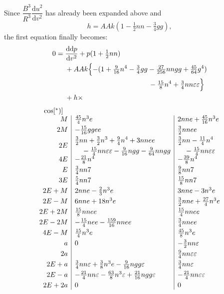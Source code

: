 \begingroup
{}
\renewcommand{\headrulewidth}{0pt}
\par\noindent Since \(\dfrac{B^3}{R^3}\dfrac{\mathrm du^2}{\mathrm dv^2}\) has already been expanded above and
\[
h=AAk(1-\tfrac12nn-\tfrac34gg),
\]
\noindent the first equation finally becomes:
\[
\begin{aligned}
0={}&\frac{\mathrm d\mathrm dp}{\mathrm dv^2}+p(1+\tfrac12nn)\\
&+AAk\Bigl\{-(1+\tfrac{9}{16}n^4-\tfrac34gg-\tfrac{27}{256}nngg+\tfrac{45}{64}g^4)\\
&\hspace{42mm}-\tfrac{15}{8}n^4+\tfrac34nn\varepsilon\varepsilon\Bigr\}\\
&+h\times
\end{aligned}
\]
\[
\begin{array}{r|l|l}
\multicolumn{1}{c}{\cos[{}^{*})]}&\multicolumn{1}{c}{}&\\
M&\tfrac{45}{4}n^3e&2nne+\tfrac{45}{16}n^3e\\[3pt]
2M&-\tfrac{15}{16}ggee&\tfrac32nnee\\[3pt]
2E&\begin{aligned}
&\tfrac32nn+\tfrac32n^3+\tfrac94n^4+3nnee\\
&\quad-\tfrac{15}{4}nn\varepsilon\varepsilon-\tfrac{9}{16}ngg-\tfrac{9}{64}nngg
\end{aligned}&
\begin{aligned}
&\tfrac32nn-\tfrac{11}{4}n^4\\
&\quad-\tfrac{15}{4}nn\varepsilon\varepsilon
\end{aligned}\\[3pt]
4E&-\tfrac{21}{8}n^4&-\tfrac{39}{8}n^4\\[3pt]
E&\tfrac34nn7&\tfrac98nn7\\[3pt]
3E&\tfrac54nn7&\tfrac{15}{8}nn7\\[3pt]
2E+M&2nne-\tfrac23n^3e&3nne-3n^3e\\[3pt]
2E-M&6nne+18n^3e&\tfrac32nne+\tfrac{27}{4}n^3e\\[3pt]
2E+2M&\tfrac{15}{8}nnee&\tfrac{15}{4}nnee\\[3pt]
2E-2M&-\tfrac{15}{4}nee-\tfrac{159}{16}nnee&\tfrac34nnee\\[3pt]
4E-M&\tfrac{15}{4}n^3e&\tfrac{45}{8}n^3e\\[3pt]
a&0&-\tfrac32nn\varepsilon\\[3pt]
2a&&\tfrac94nn\varepsilon\varepsilon\\[3pt]
2E+a&\tfrac34nn\varepsilon+\tfrac38n^3e-\tfrac{9}{16}ngg\varepsilon&\tfrac34nn\varepsilon\\[3pt]
2E-a&-\tfrac{21}{4}nn\varepsilon-\tfrac{63}{8}n^3\varepsilon+\tfrac{21}{16}ngg\varepsilon&-\tfrac{21}{4}nn\varepsilon\varepsilon\\[3pt]
2E+2a&0&0
\end{array}
\]
